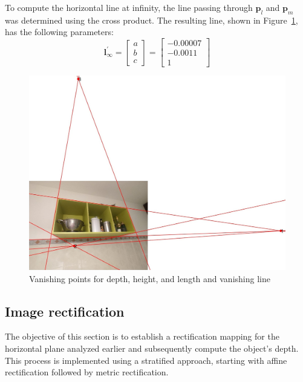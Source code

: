 \documentclass{Academic}
\begin{document}
To compute the horizontal line at infinity, the line passing through $\mathbf{p}_l$ and $\mathbf{p}_m$ was determined using the cross product. 
The resulting line, shown in Figure~\ref{fig:vanishing}, has the following parameters:
\begin{equation}\mathbf{l}_{\infty}^\prime=\begin{bmatrix}
    a \\ b \\ c
\end{bmatrix}=\begin{bmatrix}
    -0.00007 \\ -0.0011 \\ 1
\end{bmatrix}\end{equation}
\begin{figure}[!htb]
    \centering
    \includegraphics[width=0.5\linewidth]{images/vanishing.jpg}
    \caption{Vanishing points for depth, height, and length and vanishing line}
    \label{fig:vanishing}
\end{figure}

\subsection{Image rectification}
The objective of this section is to establish a rectification mapping for the horizontal plane analyzed earlier and subsequently compute the object's depth. 
This process is implemented using a stratified approach, starting with affine rectification followed by metric rectification.
\end{document}
